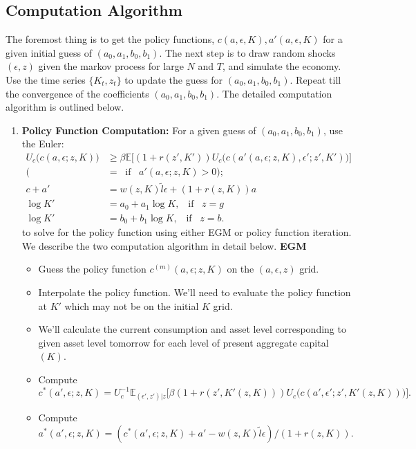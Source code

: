 \documentclass[12pt]{article}
\begin{document}
\subsection{Computation Algorithm}
The foremost thing is to get the policy functions, $c(a, \epsilon, K), a'(a, \epsilon, K)$ for a given initial guess of $(a_0, a_1, b_0, b_1)$. The next step is to draw random shocks $(\epsilon, z)$ given the markov process for large $N$ and $T$, and simulate the economy. Use the time series $\{K_t, z_t\}$ to update the guess for $(a_0, a_1, b_0, b_1)$. Repeat till the convergence of the coefficients $(a_0, a_1, b_0, b_1)$. The detailed computation algorithm is outlined below.
\begin{enumerate}
\item \textbf{Policy Function Computation:} For a given guess of $(a_0, a_1, b_0, b_1)$, use the Euler:
\begin{align*}
U_c\Big(c(a, \epsilon; z, K)  \Big) & \geq \beta \mathbb{E}\Big[(1+r(z', K'))U_c\Big( c(a'(a, \epsilon; z, K), \epsilon'; z', K') \Big) \Big] \\
(&= \; \; \text{if} \; \; \; a'(a, \epsilon; z, K) >0); \\
c + a' & = w(z, K)\tilde{l}\epsilon + (1 + r(z, K))a \\
\log K' & = a_0 + a_1 \log K, \; \; \; \text{if} \; \; \; z = g\\
\log K' & = b_0 + b_1 \log K, \; \; \; \text{if} \; \; \; z = b.
\end{align*}
to solve for the policy function using either EGM or policy function iteration. We describe the two computation algorithm in detail below.
\textbf{EGM}
\begin{itemize}
\item Guess the policy function $c^{(m)}(a, \epsilon; z, K)$ on the $(a, \epsilon, z)$ grid.
\item Interpolate the policy function. We'll need to evaluate the policy function at $K'$ which may not be on the initial $K$ grid.
\item We'll calculate the current consumption and asset level corresponding to given asset level tomorrow for each level of present aggregate capital $(K)$.
\item Compute $c^*(a', \epsilon; z, K) = U_c^{-1} \mathbb{E}_{(\epsilon', z')|z} \Big[\beta(1+r(z', K'(z, K)))U_c\Big( c(a', \epsilon'; z', K'(z, K)) \Big) \Big].$
\item Compute $a^*(a', \epsilon; z, K) =(c^*(a', \epsilon; z, K) + a' - w(z, K)\tilde{l}\epsilon )/(1 + r(z, K)).$

\end{itemize}
\end{enumerate}
\end{document}
